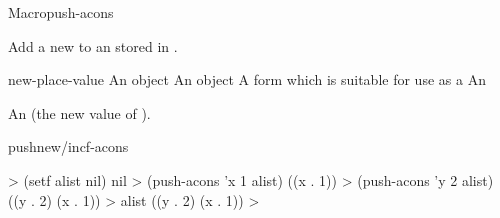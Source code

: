 \documentclass[10pt,twoside,english,pdftex]{article}
\begin{document}
\begin{functiondoc}{Macro}{push-acons}{
    \returns{} } 
%
%
  
\fnsyntax

\fnpurpose Add a new   to an
 stored in .

\fnpackage {}

\fnmodule {}

\fnargs
\begin{args}{new-place-value}
\arg[item] An object
\arg[value] An object
\arg[place] A form which is suitable for use as a
 An 
\end{args}

\fnreturns An  (the new value of
). 

\begin{alsos}{pushnew/incf-acons}
\end{alsos}

\fnexamples
%
\W\supp
\begin{example}
  > (setf alist nil)
  nil
  > (push-acons 'x 1 alist)
  ((x . 1))\goodpagebreak
  > (push-acons 'y 2 alist)
  ((y . 2) (x . 1))
  > alist
  ((y . 2) (x . 1))
  >
\end{example}

\end{functiondoc}

\end{document}
